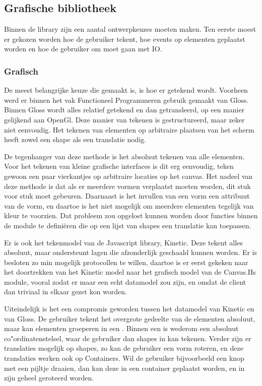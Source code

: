 \subsection{Grafische bibliotheek} \label{subsec:grafische_bibliotheek}

Binnen de library zijn een aantal ontwerpkeuzes moeten maken. Ten eerste moest er gekozen worden hoe de gebruiker tekent, hoe events op elementen geplaatst worden en hoe de gebruiker om moet gaan met IO.

\subsubsection{Grafisch}
De meest belangrijke keuze die gemaakt is, is hoe er getekend wordt. Voorheen werd er binnen het vak Functioneel Programmeren gebruik gemaakt van Gloss. Binnen Gloss wordt alles relatief getekend en dan getransleerd, op een manier gelijkend aan OpenGl. Deze manier van tekenen is gestructureerd, maar zeker niet eenvoudig. Het tekenen van elementen op arbitraire plaatsen van het scherm heeft zowel een shape als een translatie nodig.

De tegenhanger van deze methode is het absoluut tekenen van alle elementen. Voor het tekenen van kleine grafische interfaces is dit erg eenvoudig, teken gewoon een paar vierkantjes op arbitraire locaties op het canvas. Het nadeel van deze methode is dat als er meerdere vormen verplaatst moeten worden, dit stuk voor stuk moet gebeuren. Daarnaast is het invullen van een vorm een attribuut van de vorm, en daartoe is het niet mogelijk om meerdere elementen tegelijk van kleur te voorzien. Dat probleem zou opgelost kunnen worden door functies binnen de module te defini\"eren die op een lijst van shapes een translatie kan toepassen.

Er is ook het tekenmodel van de Javascript library, Kinetic. Deze tekent alles absoluut, maar ondersteunt lagen die afzonderlijk geschaald kunnen worden. Er is besloten zo min mogelijk protocollen te willen, daartoe is er eerst gekeken naar het doortrekken van het Kinetic model naar het grafisch model van de Canvas.Hs module, vooral zodat er maar een echt datamodel zou zijn, en omdat de client dan triviaal in elkaar gezet kon worden.

Uiteindelijk is het een compromis geworden tussen het datamodel van Kinetic en van Gloss. De gebruiker tekent het overgrote gedeelte van de elementen absoluut, maar kan elementen groeperen in een . Binnen een  is wederom een absoluut co"ordinatenstelsel, waar de gebruiker dan shapes in kan tekenen. Verder zijn er translaties mogelijk op shapes, zo kan de gebruiker een vorm roteren, en deze translaties werken ook op Containers. Wil de gebruiker bijvoorbeeld een knop met een pijltje draaien, dan kan deze in een container geplaatst worden, en in zijn geheel geroteerd worden.

